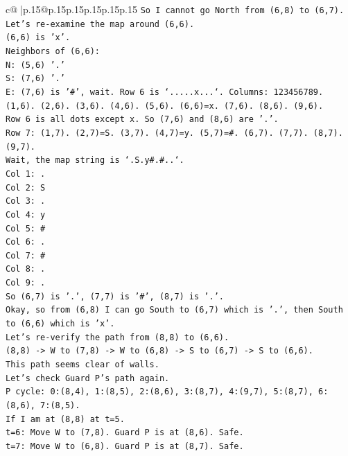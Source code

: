 \documentclass{article}
\begin{document}
{\begin{supertabular}{c@{$\;$}|p{.15\linewidth}@{}p{.15\linewidth}p{.15\linewidth}p{.15\linewidth}p{.15\linewidth}p{.15\linewidth}}
{{{\texttt{So I cannot go North from (6,8) to (6,7).} \\
\texttt{Let's re{-}examine the map around (6,6).} \\
\texttt{(6,6) is 'x'.} \\
\texttt{Neighbors of (6,6):} \\
\texttt{N: (5,6) '.'} \\
\texttt{S: (7,6) '.'} \\
\texttt{E: (7,6) is '\#', wait. Row 6 is `.....x...`. Columns: 123456789.} \\
\texttt{(1,6). (2,6). (3,6). (4,6). (5,6). (6,6)=x. (7,6). (8,6). (9,6).} \\
\texttt{Row 6 is all dots except x. So (7,6) and (8,6) are '.'.} \\
\texttt{Row 7: (1,7). (2,7)=S. (3,7). (4,7)=y. (5,7)=\#. (6,7). (7,7). (8,7). (9,7).} \\
\texttt{Wait, the map string is `.S.y\#.\#..`.} \\
\texttt{Col 1: .} \\
\texttt{Col 2: S} \\
\texttt{Col 3: .} \\
\texttt{Col 4: y} \\
\texttt{Col 5: \#} \\
\texttt{Col 6: .} \\
\texttt{Col 7: \#} \\
\texttt{Col 8: .} \\
\texttt{Col 9: .} \\
\texttt{So (6,7) is '.', (7,7) is '\#', (8,7) is '.'.} \\
\texttt{Okay, so from (6,8) I can go South to (6,7) which is '.', then South to (6,6) which is 'x'.} \\
\texttt{Let's re{-}verify the path from (8,8) to (6,6).} \\
\texttt{(8,8) {-}> W to (7,8) {-}> W to (6,8) {-}> S to (6,7) {-}> S to (6,6).} \\
\texttt{This path seems clear of walls.} \\
\texttt{Let's check Guard P's path again.} \\
\texttt{P cycle: 0:(8,4), 1:(8,5), 2:(8,6), 3:(8,7), 4:(9,7), 5:(8,7), 6:(8,6), 7:(8,5).} \\
\texttt{If I am at (8,8) at t=5.} \\
\texttt{t=6: Move W to (7,8). Guard P is at (8,6). Safe.} \\
\texttt{t=7: Move W to (6,8). Guard P is at (8,7). Safe.} \\
}}}
\end{supertabular}}
\end{document}
